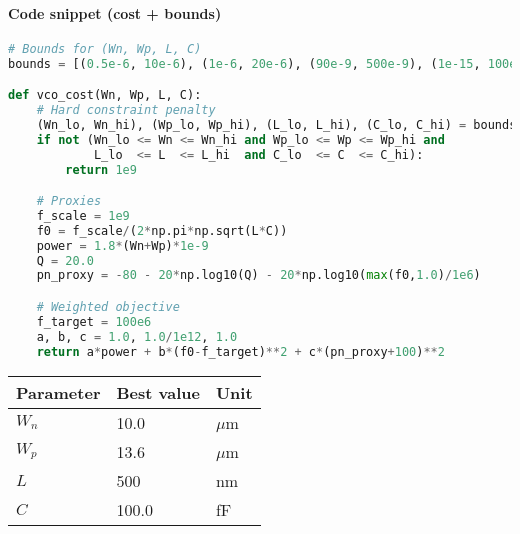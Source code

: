 \paragraph{Code snippet (cost + bounds)}
\begin{lstlisting}[language=Python]
# Bounds for (Wn, Wp, L, C)
bounds = [(0.5e-6, 10e-6), (1e-6, 20e-6), (90e-9, 500e-9), (1e-15, 100e-15)]

def vco_cost(Wn, Wp, L, C):
    # Hard constraint penalty
    (Wn_lo, Wn_hi), (Wp_lo, Wp_hi), (L_lo, L_hi), (C_lo, C_hi) = bounds
    if not (Wn_lo <= Wn <= Wn_hi and Wp_lo <= Wp <= Wp_hi and
            L_lo  <= L  <= L_hi  and C_lo  <= C  <= C_hi):
        return 1e9

    # Proxies
    f_scale = 1e9
    f0 = f_scale/(2*np.pi*np.sqrt(L*C))
    power = 1.8*(Wn+Wp)*1e-9
    Q = 20.0
    pn_proxy = -80 - 20*np.log10(Q) - 20*np.log10(max(f0,1.0)/1e6)

    # Weighted objective
    f_target = 100e6
    a, b, c = 1.0, 1.0/1e12, 1.0
    return a*power + b*(f0-f_target)**2 + c*(pn_proxy+100)**2
\end{lstlisting}
\begin{table}[H]
  \centering
  \begin{tabular}{lll}
    \toprule
    Parameter & Best value & Unit \\
    \midrule
    $W_n$ & 10.0 & $\mu$m \\
    $W_p$ & 13.6 & $\mu$m \\
    $L$ & 500 & nm \\
    $C$ & 100.0 & fF \\
    \bottomrule
  \end{tabular}
\end{table}

